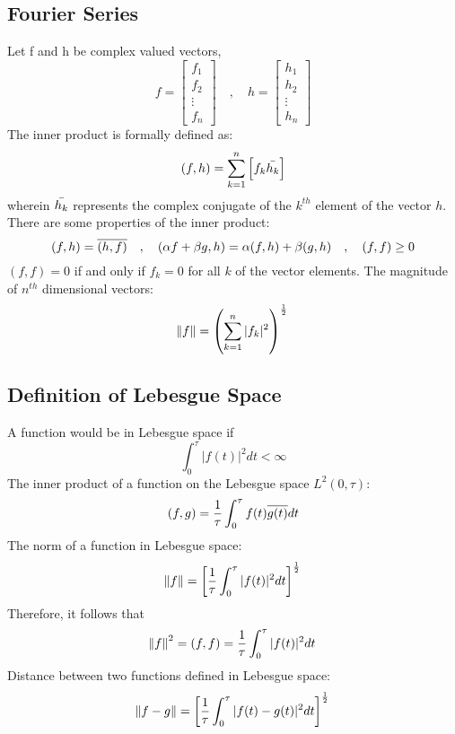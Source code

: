\documentclass[a4paper, 12pt]{report}
\begin{document}
\begin{center}

\chapter{Fourier Series}
\begin{comment}
Fourier Transform Header
The Fourier Series in Trigonometric form,$$f(t) = \f{1}{2}a_0 + \sum_{n = 1}^{\infty}\l[a_n \cos\l(\f{n\pi}{L}t\r) + b_n \sin\l(\f{n\pi}{L}t\r)\r]$$
\end{comment}
\begin{comment}
\end{comment}
Let f and h be complex valued vectors,$$f = \begin{bmatrix}f_1\\f_2\\\vdots \\f_n \end{bmatrix}\quad,\quad h = \begin{bmatrix}h_1\\h_2\\\vdots \\h_n \end{bmatrix}$$
The inner product is formally defined as:
$$(f,h) = \sum_{k = 1}^{n}\left[f_k\bar{h_k}\right]$$
wherein $\bar{h_k}$ represents the complex conjugate of the $k^{th}$ element of the vector $h$. There are some properties of the inner product:
$$(f,h) = \overline{(h,f)}\quad,\quad (\alpha f + \beta g,h) = \alpha(f,h) + \beta(g,h) \quad,\quad (f,f)\geq0$$
$(f,f) = 0$ if and only if $f_k = 0$ for all $k$ of the vector elements. The magnitude of $n^{th}$ dimensional vectors:
$$\norm{f} = \left(\sum_{k = 1}^{n}|f_k|^2\right)^{\frac{1}{2}}$$
\section{Definition of Lebesgue Space}
\begin{comment}
\end{comment}
A function would be in Lebesgue space if
$$\int^{\tau}_{0}|f(t)|^2dt < \infty$$
The inner product of a function on the Lebesgue space $L^2(0,\tau)$:
$$(f,g) = \frac{1}{\tau}\int^{\tau}_{0}f(t)\overline{g(t)}dt$$
The norm of a function in Lebesgue space:
$$\norm{f} = \left[\frac{1}{\tau}\int^{\tau}_{0}|f(t)|^2dt\right]^\frac{1}{2}$$
Therefore, it follows that 
$$\norm{f}^2 = (f,f) = \frac{1}{\tau}\int^{\tau}_{0}|f(t)|^2dt$$
Distance between two functions defined in Lebesgue space:
$$\norm{f - g} = \left[\frac{1}{\tau}\int^{\tau}_{0}|f(t) - g(t)|^2dt\right]^\frac{1}{2}$$

\end{center}
\end{document}
